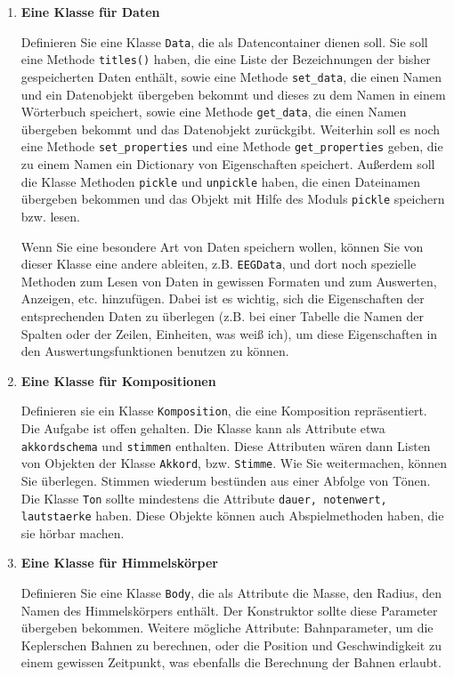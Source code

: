 \begin{enumerate}[1.]
\item \textbf{Eine Klasse für Daten}

Definieren Sie eine Klasse \texttt{Data}, die als Datencontainer dienen
soll. Sie soll eine Methode \texttt{titles()} haben, die eine Liste
der Bezeichnungen der bisher gespeicherten Daten enthält, sowie eine Methode
\texttt{set\_data}, die einen Namen und ein Datenobjekt übergeben bekommt
und dieses zu dem Namen in einem Wörterbuch speichert, sowie eine
Methode \texttt{get\_data}, die einen Namen übergeben bekommt und
das Datenobjekt zurückgibt.  Weiterhin soll es noch eine
Methode \texttt{set\_properties} und eine Methode \texttt{get\_properties}
geben, die zu einem Namen ein Dictionary von Eigenschaften speichert.
Außerdem soll die Klasse Methoden \texttt{pickle} und \texttt{unpickle}
haben, die einen Dateinamen übergeben bekommen und das Objekt 
mit Hilfe des Moduls \texttt{pickle} speichern bzw. lesen.

Wenn Sie eine besondere Art von Daten speichern wollen, können Sie
 von dieser Klasse eine andere ableiten, z.B. \texttt{EEGData},
und dort noch spezielle Methoden zum Lesen von Daten in gewissen
Formaten und zum Auswerten, Anzeigen, etc. hinzufügen.  Dabei ist
es wichtig, sich die Eigenschaften der entsprechenden Daten
zu überlegen (z.B. bei einer Tabelle die Namen der Spalten oder
der Zeilen, Einheiten, was weiß ich), um diese Eigenschaften in
den Auswertungsfunktionen benutzen zu können.

\item \textbf{Eine Klasse für Kompositionen}

Definieren sie ein Klasse \texttt{Komposition}, 
die eine Komposition repräsentiert.
Die Aufgabe ist offen gehalten. Die Klasse kann als Attribute
etwa \texttt{akkordschema} und \texttt{stimmen} enthalten.
Diese Attributen wären dann Listen von Objekten der Klasse
\texttt{Akkord}, bzw. \texttt{Stimme}.  Wie Sie 
weitermachen, können Sie überlegen. Stimmen wiederum
bestünden aus einer Abfolge von Tönen. Die Klasse
\texttt{Ton} sollte mindestens die Attribute 
\texttt{dauer, notenwert, lautstaerke} haben.  Diese Objekte können
auch Abspielmethoden haben, die sie hörbar machen.

\item \textbf{Eine Klasse für Himmelskörper}

Definieren Sie eine Klasse \texttt{Body}, die als Attribute
die Masse, den Radius, den Namen des Himmelskörpers enthält.
Der Konstruktor sollte diese Parameter übergeben bekommen.
Weitere mögliche Attribute: Bahnparameter, um die Keplerschen
Bahnen zu berechnen, oder die Position und Geschwindigkeit 
zu einem gewissen Zeitpunkt, was ebenfalls die Berechnung der Bahnen
erlaubt.   


\end{enumerate}
